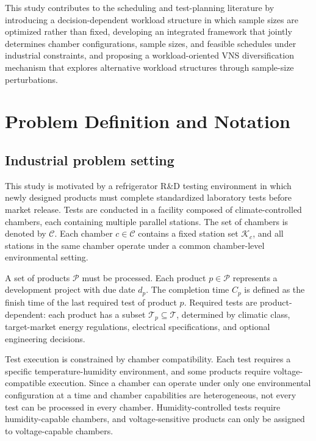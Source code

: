 \documentclass[11pt]{article}
\begin{document}
This study contributes to the scheduling and test-planning literature by introducing a decision-dependent workload structure in which sample sizes are optimized rather than fixed, developing an integrated framework that jointly determines chamber configurations, sample sizes, and feasible schedules under industrial constraints, and proposing a workload-oriented VNS diversification mechanism that explores alternative workload structures through sample-size perturbations.

\section{Problem Definition and Notation}
\label{sec:pd}
\subsection{Industrial problem setting}
\label{subsec:industrial_setting}

This study is motivated by a refrigerator R\&D testing environment in which newly designed products must complete standardized laboratory tests before market release. Tests are conducted in a facility composed of climate-controlled chambers, each containing multiple parallel stations. The set of chambers is denoted by \(\mathcal{C}\). Each chamber \(c\in\mathcal{C}\) contains a fixed station set \(\mathcal{K}_c\), and all stations in the same chamber operate under a common chamber-level environmental setting.

A set of products \(\mathcal{P}\) must be processed. Each product \(p\in\mathcal{P}\) represents a development project with due date \(d_p\). The completion time \(C_p\) is defined as the finish time of the last required test of product \(p\). Required tests are product-dependent: each product has a subset \(\mathcal{T}_p\subseteq\mathcal{T}\), determined by climatic class, target-market energy regulations, electrical specifications, and optional engineering decisions.

Test execution is constrained by chamber compatibility. Each test requires a specific temperature-humidity environment, and some products require voltage-compatible execution. Since a chamber can operate under only one environmental configuration at a time and chamber capabilities are heterogeneous, not every test can be processed in every chamber. Humidity-controlled tests require humidity-capable chambers, and voltage-sensitive products can only be assigned to voltage-capable chambers.
\end{document}
